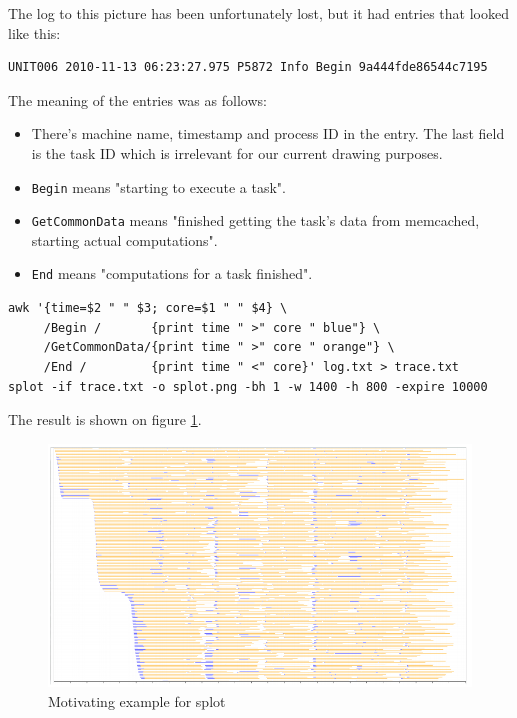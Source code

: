 \documentclass{article}
\begin{document}
The log to this picture has been unfortunately lost, but it had entries that looked like this:

\begin{verbatim}
UNIT006 2010-11-13 06:23:27.975 P5872 Info Begin 9a444fde86544c7195
\end{verbatim}

The meaning of the entries was as follows:

\begin{itemize}
\item There's machine name, timestamp and process ID in the entry. The last field is the task ID which is irrelevant for our current drawing purposes.
\item \verb|Begin| means "starting to execute a task".
\item \verb|GetCommonData| means "finished getting the task's data from memcached, starting actual computations".
\item \verb|End| means "computations for a task finished".
\end{itemize}

\begin{verbatim}
awk '{time=$2 " " $3; core=$1 " " $4} \
     /Begin /       {print time " >" core " blue"} \
     /GetCommonData/{print time " >" core " orange"} \
     /End /         {print time " <" core}' log.txt > trace.txt
splot -if trace.txt -o splot.png -bh 1 -w 1400 -h 800 -expire 10000
\end{verbatim}

The result is shown on figure \ref{fig:splot-main-example}.

\begin{figure}
\center
\includegraphics[width=\textwidth]{pics/splot/splot-main-example.png}
\caption{Motivating example for splot}
\label{fig:splot-main-example}
\end{figure}
\end{document}
